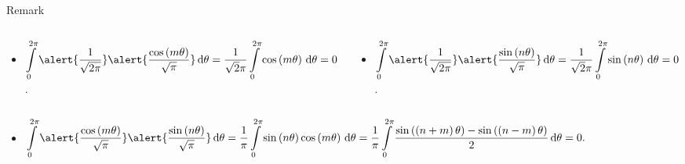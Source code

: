 \begin{frame}
\begin{block}{Remark~\cite{Herman2021}}
		\begin{columns}
			\begin{column}{0.45\textwidth}
				\begin{itemize}
					\item

					      \begin{math}
						      \displaystyle
						      \int\limits_{0}^{2\pi}
						      \alert{\frac{1}{\sqrt{2\pi}}}
						      \alert{\frac{\cos\left(m\theta\right)}{\sqrt{\pi}}}
						      \dl\theta=
						      \frac{1}{\sqrt{2}\pi}
						      \int\limits_{0}^{2\pi}
						      \cos\left(m\theta\right)
						      \dl\theta=
						      0
					      \end{math}.
				\end{itemize}
			\end{column}
			\begin{column}{0.45\textwidth}
				\begin{itemize}
					\item

					      \begin{math}
						      \displaystyle
						      \int\limits_{0}^{2\pi}
						      \alert{\frac{1}{\sqrt{2\pi}}}
						      \alert{\frac{\sin\left(n\theta\right)}{\sqrt{\pi}}}
						      \dl\theta=
						      \frac{1}{\sqrt{2}\pi}
						      \int\limits_{0}^{2\pi}
						      \sin\left(n\theta\right)
						      \dl\theta=
						      0
					      \end{math}.
				\end{itemize}
			\end{column}
		\end{columns}

		\begin{itemize}

			\item

			      \begin{math}
				      \displaystyle
				      \int\limits_{0}^{2\pi}
				      \alert{\frac{\cos\left(m\theta\right)}{\sqrt{\pi}}}
				      \alert{\frac{\sin\left(n\theta\right)}{\sqrt{\pi}}}
				      \dl\theta=
				      \frac{1}{\pi}
				      \int\limits_{0}^{2\pi}
				      \sin\left(n\theta\right)
				      \cos\left(m\theta\right)
				      \dl\theta=
				      \frac{1}{\pi}
				      \int\limits_{0}^{2\pi}
				      \frac{
					      \sin\left(\left(n+m\right)\theta\right)-
					      \sin\left(\left(n-m\right)\theta\right)
				      }{2}
				      \dl\theta=
				      0.
			      \end{math}
		\end{itemize}
	\end{block}
\end{frame}

